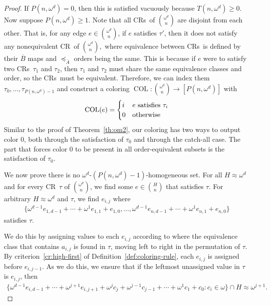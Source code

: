 \documentclass[10pt,a4paper]{article}
\newcommand{\om}{\omega}
\newcommand{\oequiv}{\approx}
\newcommand{\COL}{\operatorname{COL}}
\newcommand{\crulenospace}{CR}
\newcommand{\crule}{\crulenospace~}
\newcommand{\crules}{\crulenospace s~}
\newcommand{\xleq}{\preceq_{\overline{A}}}
\newcommand{\assny}{\overline{B}}
\newcommand{\numpoints}{n}
\newcommand{\inumpoints}{i}
\newcommand{\idegr}{j}
\newcommand{\commonconst}{a}
\theoremstyle{plain}
\theoremstyle{definition}
\begin{document}
\begin{proof}
If $P(\numpoints,\om^d) = 0$, then this is satisfied vacuously because $T(\numpoints, \om^d) \geq 0$. Now suppose $P(\numpoints,\om^d) \geq 1$. Note that all \crules of $\binom{\om^d}{\numpoints}$ are disjoint from each other. That is, for any edge $e \in \binom{\om^d}{\numpoints}$, if $e$ satisfies $\tau'$, then it does not satisfy any nonequivalent \crule of $\binom{\om^d}{\numpoints},$ where
equivalence between \crules is defined by their $\assny$ maps and $\xleq$ orders being
the same. This is because if $e$ were to satisfy two \crules $\tau_1$ and $\tau_2$, then $\tau_1$ and $\tau_2$ must share the same equivalence classes and order, so the \crules must be equivalent. Therefore, we can index them $\tau_0, \ldots, \tau_{P(\numpoints, \om^d)-1}$ and construct a coloring $\COL \colon \binom{\om^d}{\numpoints} \to [P(\numpoints, \om^d)]$ with\begin{align*}
    \COL(e) = \begin{cases}
    i & e \textnormal{ satisfies } \tau_i\\
    0 & \textnormal{otherwise}
    \end{cases}
\end{align*}
Similar to the proof of Theorem~\ref{th:om2}, our coloring has two ways to output color 0, both 
through the satisfaction of $\tau_0$ and through the catch-all case. The part that forces 
color 0 to be present in all order-equivalent subsets is the satisfaction of $\tau_0$.

We now prove there is no $\omega^d$-$(P(\numpoints,\om^d)-1)$-homogeneous set. 
For all $H \oequiv \om^{d}$ and 
for every \crule $\tau$ of $\binom{\om^d}{\numpoints}$, 
we find some $e \in \binom{H}{\numpoints}$ that satisfies $\tau$.
For arbitrary $H \oequiv \om^{d}$ and $\tau$, we find $e_{\inumpoints,\idegr}$ where 
\begin{align*}
    \{\om^{d-1} e_{1,d-1} + \cdots + \om^{1} e_{1,1} + e_{1,0}, \ldots,
    \om^{d-1} e_{\numpoints,d-1} + \cdots + \om^{1} e_{\numpoints,1} + e_{\numpoints,0}\}
\end{align*}
satisfies $\tau$.

We do this by assigning values to each $e_{\inumpoints,\idegr}$ according to where the equivalence class
that contains $\commonconst_{\inumpoints,\idegr}$ is found in $\tau$, moving left to right in the permutation of $\tau$. By criterion~\ref{cr:high-first}
of Definition~\ref{def:coloring-rule}, 
each $e_{\inumpoints,\idegr}$ is assigned before $e_{\inumpoints,\idegr-1}$. As we do this, we ensure that if the leftmost unassigned value in $\tau$ is $e_{\inumpoints,\idegr}$, then \begin{multline*}\{ \om^{d-1} e_{\inumpoints,d-1} + \cdots + \om^{\idegr+1} e_{\inumpoints,\idegr+1} + \om^\idegr c_{\idegr} + \om^{\idegr-1} c_{\idegr-1} + \cdots + \om^1 c_1 + c_0 : c_i \in \om\} \cap H \oequiv \om^{\idegr+1}.\end{multline*}


\end{proof}
\end{document}
